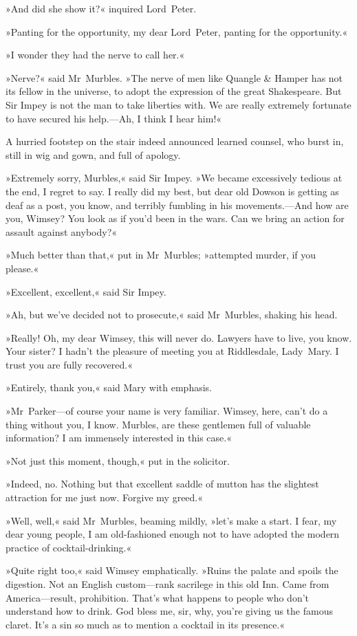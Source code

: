 »And did she show it?« inquired Lord~Peter.

»Panting for the opportunity, my dear Lord~Peter, panting for the opportunity.«

»I wonder they had the nerve to call her.«

»Nerve?« said Mr~Murbles. »The nerve of men like Quangle \& Hamper has not its fellow in the universe, to adopt the expression of the great Shakespeare. But Sir Impey is not the man to take liberties with. We are really extremely fortunate to have secured his help.—Ah, I think I hear him!«

A hurried footstep on the stair indeed announced learned counsel, who burst in, still in wig and gown, and full of apology.

»Extremely sorry, Murbles,« said Sir Impey. »We became excessively tedious at the end, I regret to say. I really did my best, but dear old Dowson is getting as deaf as a post, you know, and terribly fumbling in his movements.—And how are you, Wimsey? You look as if you'd been in the wars. Can we bring an action for assault against anybody?«

»Much better than that,« put in Mr~Murbles; »attempted murder, if you please.«

»Excellent, excellent,« said Sir Impey.

»Ah, but we've decided not to prosecute,« said Mr~Murbles, shaking his head.

»Really! Oh, my dear Wimsey, this will never do. Lawyers have to live, you know. Your sister? I hadn't the pleasure of meeting you at Riddlesdale, Lady~Mary. I trust you are fully recovered.«

»Entirely, thank you,« said Mary with emphasis.

»Mr~Parker—of course your name is very familiar. Wimsey, here, can't do a thing without you, I know. Murbles, are these gentlemen full of valuable information? I am immensely interested in this case.«

»Not just this moment, though,« put in the solicitor.

»Indeed, no. Nothing but that excellent saddle of mutton has the slightest attraction for me just now. Forgive my greed.«

»Well, well,« said Mr~Murbles, beaming mildly, »let's make a start.  I fear, my dear young people, I am old-fashioned enough not to have adopted the modern practice of cocktail-drinking.«

»Quite right too,« said Wimsey emphatically. »Ruins the palate and spoils the digestion. Not an English custom—rank sacrilege in this old Inn. Came from America—result, prohibition. That's what happens to people who don't understand how to drink. God bless me, sir, why, you're giving us the famous claret. It's a sin so much as to mention a cocktail in its presence.«

